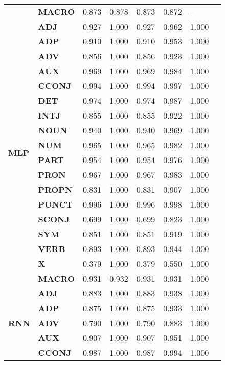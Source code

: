 \begin{longtable}{|l||l||l||l||l||l||l||l|}
\textbf{} & \textbf{MACRO} & 0.873 & 0.878 & 0.873 & 0.872 & - \\
\cline{1-7}
\multirow[t]{18}{*}{\textbf{MLP}} & \textbf{ADJ} & 0.927 & 1.000 & 0.927 & 0.962 & 1.000 \\
\textbf{} & \textbf{ADP} & 0.910 & 1.000 & 0.910 & 0.953 & 1.000 \\
\textbf{} & \textbf{ADV} & 0.856 & 1.000 & 0.856 & 0.923 & 1.000 \\
\textbf{} & \textbf{AUX} & 0.969 & 1.000 & 0.969 & 0.984 & 1.000 \\
\textbf{} & \textbf{CCONJ} & 0.994 & 1.000 & 0.994 & 0.997 & 1.000 \\
\textbf{} & \textbf{DET} & 0.974 & 1.000 & 0.974 & 0.987 & 1.000 \\
\textbf{} & \textbf{INTJ} & 0.855 & 1.000 & 0.855 & 0.922 & 1.000 \\
\textbf{} & \textbf{NOUN} & 0.940 & 1.000 & 0.940 & 0.969 & 1.000 \\
\textbf{} & \textbf{NUM} & 0.965 & 1.000 & 0.965 & 0.982 & 1.000 \\
\textbf{} & \textbf{PART} & 0.954 & 1.000 & 0.954 & 0.976 & 1.000 \\
\textbf{} & \textbf{PRON} & 0.967 & 1.000 & 0.967 & 0.983 & 1.000 \\
\textbf{} & \textbf{PROPN} & 0.831 & 1.000 & 0.831 & 0.907 & 1.000 \\
\textbf{} & \textbf{PUNCT} & 0.996 & 1.000 & 0.996 & 0.998 & 1.000 \\
\textbf{} & \textbf{SCONJ} & 0.699 & 1.000 & 0.699 & 0.823 & 1.000 \\
\textbf{} & \textbf{SYM} & 0.851 & 1.000 & 0.851 & 0.919 & 1.000 \\
\textbf{} & \textbf{VERB} & 0.893 & 1.000 & 0.893 & 0.944 & 1.000 \\
\textbf{} & \textbf{X} & 0.379 & 1.000 & 0.379 & 0.550 & 1.000 \\
\textbf{} & \textbf{MACRO} & 0.931 & 0.932 & 0.931 & 0.931 & 1.000 \\
\cline{1-7}
\multirow[t]{18}{*}{\textbf{RNN}} & \textbf{ADJ} & 0.883 & 1.000 & 0.883 & 0.938 & 1.000 \\
\textbf{} & \textbf{ADP} & 0.875 & 1.000 & 0.875 & 0.933 & 1.000 \\
\textbf{} & \textbf{ADV} & 0.790 & 1.000 & 0.790 & 0.883 & 1.000 \\
\textbf{} & \textbf{AUX} & 0.907 & 1.000 & 0.907 & 0.951 & 1.000 \\
\textbf{} & \textbf{CCONJ} & 0.987 & 1.000 & 0.987 & 0.994 & 1.000 \\

\end{longtable}
